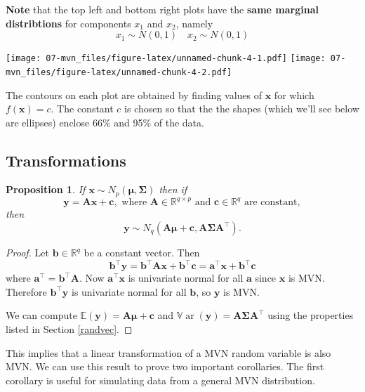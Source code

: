 \documentclass[
]{book}
\newtheorem{proposition}{Proposition}[chapter]
\theoremstyle{definition}
\theoremstyle{definition}
\theoremstyle{definition}
\theoremstyle{definition}
\theoremstyle{remark}
\begin{document}
\textbf{Note} that the top left and bottom right plots have the \textbf{same marginal distribtions} for components \(x_1\) and \(x_2\), namely
\[x_1 \sim N(0, 1)\quad x_2 \sim N(0, 1)\]

\texttt{[image: 07-mvn\_files/figure-latex/unnamed-chunk-4-1.pdf]} \texttt{[image: 07-mvn\_files/figure-latex/unnamed-chunk-4-2.pdf]}

The contours on each plot are obtained by finding values of \(\mathbf x\) for which \(f(\mathbf x)=c\). The constant \(c\) is chosen so that the the shapes (which we'll see below are ellipses)
enclose 66\% and 95\% of the data.

\hypertarget{transformations}{%
\subsection{Transformations}\label{transformations}}

\begin{proposition}
\protect\hypertarget{prp:six2}{}{\label{prp:six2} } If \(\mathbf x\sim N_p({\boldsymbol{\mu}},\boldsymbol{\Sigma})\) then if \[\mathbf y= \mathbf A\mathbf x+ \mathbf c, \mbox{ where } \mathbf A\in \mathbb{R}^{q \times p} \mbox{ and }\mathbf c\in \mathbb{R}^q
  \mbox{ are constant},\] then
\[\mathbf y\sim N_q(\mathbf A{\boldsymbol{\mu}}+ \mathbf c, \mathbf A\boldsymbol{\Sigma}\mathbf A^\top).\]
\end{proposition}

\begin{proof}
Let \(\mathbf b\in \mathbb{R}^q\) be a constant vector. Then
\[ \mathbf b^\top \mathbf y= \mathbf b^\top \mathbf A\mathbf x+ \mathbf b^\top \mathbf c= \mathbf a^\top \mathbf x+ \mathbf b^\top \mathbf c\]
where \(\mathbf a^\top = \mathbf b^\top \mathbf A\). Now \(\mathbf a^\top \mathbf x\) is univariate normal for all \(\mathbf a\) since \(\mathbf x\) is MVN. Therefore \(\mathbf b^\top \mathbf y\) is univariate normal for all \(\mathbf b\), so \(\mathbf y\) is MVN.

We can compute \({\mathbb{E}}(\mathbf y)=\mathbf A{\boldsymbol{\mu}}+\mathbf c\) and \({\mathbb{V}\operatorname{ar}}(\mathbf y)=\mathbf A\boldsymbol{\Sigma}\mathbf A^\top\) using the properties listed in Section \ref{randvec}.
\end{proof}

This implies that a linear transformation of a MVN random variable is also MVN. We can use this result to prove two important corollaries. The first corollary is useful for simulating data from a general MVN distribution.
\end{document}
